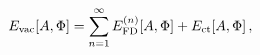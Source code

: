 \begin{equation} 
E_{\rm vac}[A,\Phi] =  
\sum_{n=1}^{\infty} E_{\rm FD}^{(n)}[A,\Phi] + E_{\rm ct}[A,\Phi]\, ,
\label{Evac1}
\end{equation}

